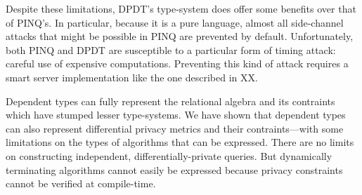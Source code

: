 \documentclass[12pt]{article}
\begin{document}
Despite these limitations, DPDT's type-system does offer some benefits over that of PINQ's.
In particular, because it is a pure language, almost all side-channel attacks that might be possible in PINQ are prevented by default.
Unfortunately, both PINQ and DPDT are susceptible to a particular form of timing attack: careful use of expensive computations.
Preventing this kind of attack requires a smart server implementation like the one described in XX.

Dependent types can fully represent the relational algebra and its contraints which have stumped lesser type-systems\cite{OurySwierstra08PowerOfPi}.
We have shown that dependent types can also represent differential privacy metrics and their contraints---with some limitations on the types of algorithms that can be expressed.
There are no limits on constructing independent, differentially-private queries.
But dynamically terminating algorithms cannot easily be expressed because privacy constraints cannot be verified at compile-time.



\end{document}
